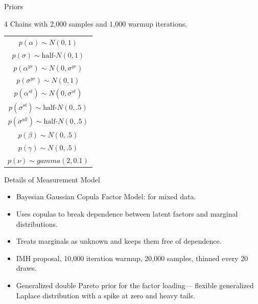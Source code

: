 \documentclass[12pt]{beamer}
\begin{document}
\begin{frame}{Priors}

4 Chains with 2,000 samples and 1,000 warmup iterations. 

\begin{table} %

 \begin{center}
\begin{tabular}{c} 
$ p(\alpha) \sim N(0, 1)$  \\
$ p(\sigma) \sim \mbox{half-}N(0, 1) $ \\
$ p(\alpha^{yr}) \sim N(0, \sigma^{yr}) $ \\ 
$ p(\sigma^{yr}) \sim N(0, 1) $ \\
$ p(\alpha^{st}) \sim N(0, \sigma^{st}) $ \\ 
$ p(\sigma^{st}) \sim \mbox{half-}N(0, .5) $ \\ 
$ p(\sigma^{all}) \sim \mbox{half-}N(0, .5) $ \\
$ p(\beta) \sim N(0, .5) $ \\
$ p(\gamma) \sim N(0, .5) $ \\ 
$ p(\nu) \sim gamma(2, 0.1)$ 
\end{tabular} 
\end{center} 
\label{tab:priors}
\end{table} 


\end{frame}



\begin{frame}{Details of Measurement Model}

\begin{itemize}
\item Bayesian Gaussian Copula Factor Model: for mixed data. 
\item Uses copulas to break dependence between latent factors and marginal distributions. 
\item Treats marginals as unknown and keeps them free of dependence. 
\item IMH proposal, 10,000 iteration warmup, 20,000 samples, thinned every 20 draws. 
\item Generalized double Pareto prior for the factor loading--- flexible generalized Laplace distribution with a spike at zero and heavy tails. 
\end{itemize} 


\end{frame}
\end{document}
